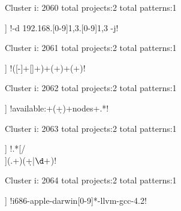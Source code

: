 Cluster i: 2060
total projects:2
total patterns:1
\begin{multicols}{1}
\begin{description}[noitemsep,topsep=0pt]
\item [[2] ] \cverb!-d 192.168.[0-9]{1,3}.[0-9]{1,3} -j!
\end{description}
\end{multicols}







Cluster i: 2061
total projects:2
total patterns:1
\begin{multicols}{1}
\begin{description}[noitemsep,topsep=0pt]
\item [[2] ] \cverb!([\w-]+[\w]+)\s+(\w+)\s+(\w+)!
\end{description}
\end{multicols}







Cluster i: 2062
total projects:2
total patterns:1
\begin{multicols}{1}
\begin{description}[noitemsep,topsep=0pt]
\item [[2] ] \cverb!available:\s+(\d+)\s+nodes\s+.*!
\end{description}
\end{multicols}







Cluster i: 2063
total projects:2
total patterns:1
\begin{multicols}{1}
\begin{description}[noitemsep,topsep=0pt]
\item [[2] ] \cverb!.*[/\\](.+)(\:\d+|\(\d+\))\:!
\end{description}
\end{multicols}







Cluster i: 2064
total projects:2
total patterns:1
\begin{multicols}{1}
\begin{description}[noitemsep,topsep=0pt]
\item [[2] ] \cverb!i686-apple-darwin[0-9]*-llvm-gcc-4.2!
\end{description}
\end{multicols}







